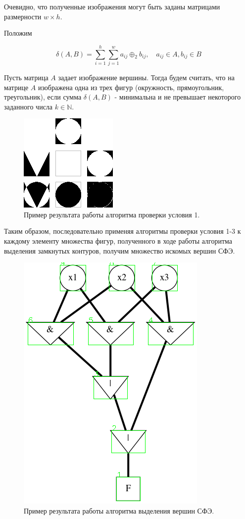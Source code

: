 \documentclass[makeidx, a4paper, 14pt]{extarticle}
\newcommand{\N}{\mathbb{N}}
\begin{document}
Очевидно, что полученные изображения могут быть заданы матрицами размерности ${w \times h}$.

Положим

\[
    \delta(A, B) = \sum_{i=1}^{h}\sum_{j=1}^{w} a_{ij} \oplus_2 b_{ij}, \quad a_{ij} \in A, b_{ij} \in B
\]

Пусть матрица $A$ задает изображение вершины. Тогда будем считать, что на матрице $A$ изображена одна из трех фигур (окружность, прямоугольник, треугольник),
если сумма $\delta(A, B)$ - минимальна и не превышает некоторого заданного числа $k \in \N$.

\begin{figure}[H]
    \centering
    \includegraphics[scale=4]{shape_diff.png}
    \caption{Пример результата работы алгоритма проверки условия 1.}
\end{figure}

Таким образом, последовательно применяя алгоритмы проверки условия 1-3 к каждому элементу множества фигур, полученного в ходе работы алгоритма
выделения замкнутых контуров, получим множество искомых вершин СФЭ.

\begin{figure}[H]
    \centering
    \includegraphics[scale=0.75]{img4_detected_vertices.png}
    \caption{Пример результата работы алгоритма выделения вершин СФЭ.}
\end{figure}
\end{document}
